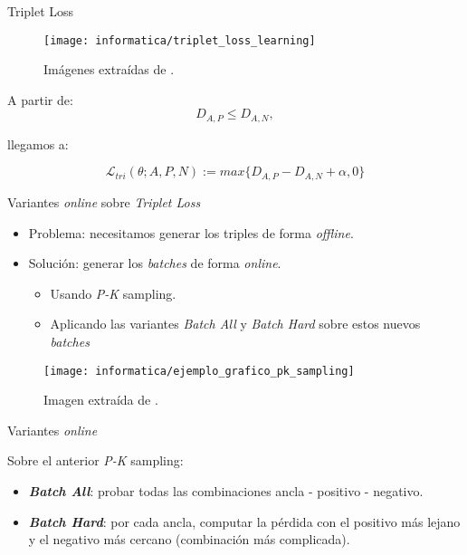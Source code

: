 \begin{frame}{Triplet Loss}
	\begin{figure}
		\texttt{[image: informatica/triplet\_loss\_learning]}
		\caption{Imágenes extraídas de .}
	\end{figure}

	A partir de:
	\begin{equation}
		D_{A, P} \leq D_{A, N},
	\end{equation}

	llegamos a:

	\begin{equation} \label{ieq:triplet_loss_single_entry}
		\mathcal{L}_{tri}(\theta; A, P, N) := max \{D_{A, P} - D_{A, N} + \alpha, 0 \}
	\end{equation}
\end{frame}

\begin{frame}{Variantes \textit{online} sobre \textit{Triplet Loss}}

	\begin{itemize}
		\item Problema: necesitamos generar los triples de forma \textit{offline}.
		\item Solución: generar los \textit{batches} de forma \textit{online}.
		      \begin{itemize}
			      \item Usando \textit{P-K} sampling.
			      \item Aplicando las variantes \textit{Batch All} y \textit{Batch Hard} sobre estos nuevos \textit{batches}
		      \end{itemize}
	\end{itemize}

	\begin{figure}
		\texttt{[image: informatica/ejemplo\_grafico\_pk\_sampling]}
		\caption{Imagen extraída de .}
	\end{figure}

\end{frame}

\begin{frame}{Variantes \textit{online}}

	Sobre el anterior \textit{P-K} sampling:

	\begin{itemize}
		\item \textbf{\textit{Batch All}}: probar todas las combinaciones ancla - positivo - negativo.
		\item \textbf{\textit{Batch Hard}}: por cada ancla, computar la pérdida con el positivo más lejano y el negativo más cercano (combinación más complicada).
	\end{itemize}

\end{frame}

